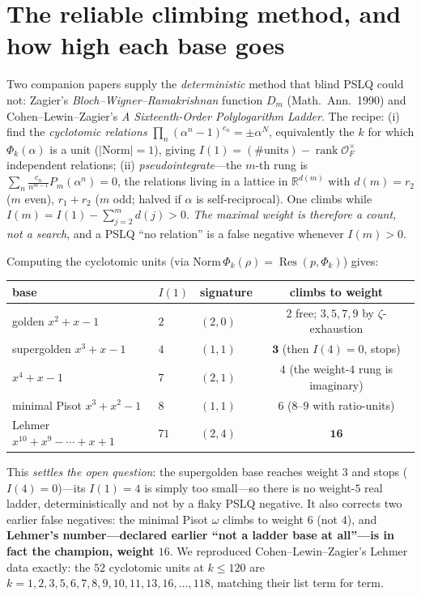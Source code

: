 \documentclass[11pt]{article}
\theoremstyle{plain}\newtheorem{theorem}{Theorem}\newtheorem{proposition}[theorem]{Proposition}
\theoremstyle{remark}\newtheorem{remark}[theorem]{Remark}
\begin{document}
\section{The reliable climbing method, and how high each base goes}
Two companion papers supply the \emph{deterministic} method that blind PSLQ could not: Zagier's
\emph{Bloch--Wigner--Ramakrishnan} function $D_m$ (Math.\ Ann.\ 1990) and Cohen--Lewin--Zagier's
\emph{A Sixteenth-Order Polylogarithm Ladder}. The recipe: (i) find the \emph{cyclotomic relations}
$\prod_n(\alpha^n-1)^{c_n}=\pm\alpha^N$, equivalently the $k$ for which $\Phi_k(\alpha)$ is a unit
($|\mathrm{Norm}|=1$), giving $I(1)=(\#\text{units})-\operatorname{rank}\mathcal O_F^\times$ independent relations;
(ii) \emph{pseudointegrate}---the $m$-th rung is $\sum_n\frac{c_n}{n^{m-1}}P_m(\alpha^n)=0$, the relations
living in a lattice in $\mathbb R^{d(m)}$ with $d(m)=r_2$ ($m$ even), $r_1+r_2$ ($m$ odd; halved if $\alpha$ is
self-reciprocal). One climbs while $I(m)=I(1)-\sum_{j=2}^m d(j)>0$. \emph{The maximal weight is therefore a
count, not a search}, and a PSLQ ``no relation'' is a false negative whenever $I(m)>0$.

Computing the cyclotomic units (via $\mathrm{Norm}\,\Phi_k(\rho)=\operatorname{Res}(p,\Phi_k)$) gives:
\begin{center}\small
\begin{tabular}{lllc}
\toprule
base & $I(1)$ & signature & climbs to weight \\
\midrule
golden $x^2+x-1$ & $2$ & $(2,0)$ & $2$ free; $3,5,7,9$ by $\zeta$-exhaustion \\
supergolden $x^3+x-1$ & $4$ & $(1,1)$ & $\mathbf 3$ (then $I(4)=0$, stops) \\
$x^4+x-1$ & $7$ & $(2,1)$ & $4$ (the weight-$4$ rung is imaginary) \\
minimal Pisot $x^3+x^2-1$ & $8$ & $(1,1)$ & $6$ ($8$--$9$ with ratio-units) \\
Lehmer $x^{10}+x^9-\cdots+x+1$ & $71$ & $(2,4)$ & $\mathbf{16}$ \\
\bottomrule
\end{tabular}
\end{center}
This \emph{settles the open question}: the supergolden base reaches weight $3$ and stops ($I(4)=0$)---its
$I(1)=4$ is simply too small---so there is no weight-$5$ real ladder, deterministically and not by a flaky PSLQ
negative. It also corrects two earlier false negatives: the minimal Pisot $\omega$ climbs to weight $6$ (not $4$),
and \textbf{Lehmer's number---declared earlier ``not a ladder base at all''---is in fact the champion, weight $16$}.
We reproduced Cohen--Lewin--Zagier's Lehmer data exactly: the $52$ cyclotomic units at $k\le120$ are
$k=1,2,3,5,6,7,8,9,10,11,13,16,\dots,118$, matching their list term for term.
\end{document}
